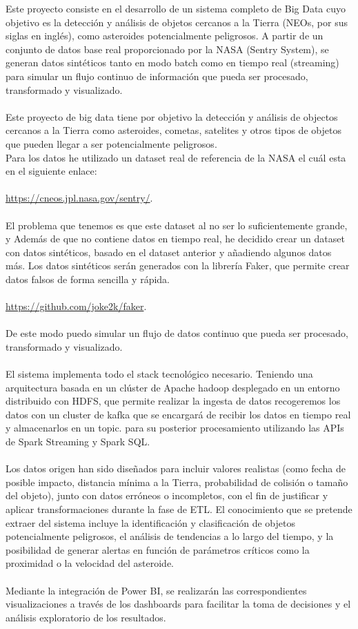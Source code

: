 \documentclass[12pt]{article}
\begin{document}
Este proyecto consiste en el desarrollo de un sistema completo de Big Data cuyo objetivo es la detección 
y análisis de objetos cercanos a la Tierra (NEOs, por sus siglas en inglés), como asteroides 
potencialmente peligrosos. A partir de un conjunto de datos base real proporcionado por la NASA 
(Sentry System), se generan datos sintéticos tanto en modo batch como en tiempo real (streaming) 
para simular un flujo continuo de información que pueda ser procesado, transformado y visualizado.
\\
\\
Este proyecto de big data tiene por objetivo la detección y análisis de objectos cercanos a la Tierra
como asteroides, cometas, satelites y otros tipos de objetos que pueden llegar a ser potencialmente
peligrosos. 
\\
Para los datos he utilizado un dataset real de referencia de la NASA el cuál esta en el siguiente
enlace: 
\\
\\
\url{https://cneos.jpl.nasa.gov/sentry/}.
\\
\\
El problema que tenemos es que este dataset al no ser lo suficientemente grande, y Además
de que no contiene datos en tiempo real, he decidido crear un dataset con datos sintéticos,
basado en el dataset anterior y añadiendo algunos datos más. Los datos sintéticos serán 
generados con la librería Faker, que permite crear datos falsos de forma sencilla y rápida.
\\
\\
\url{https://github.com/joke2k/faker}.
\\
\\
De este modo puedo simular un flujo de datos continuo que pueda ser procesado, transformado 
y visualizado.
\\
\\
El sistema implementa todo el stack tecnológico necesario. Teniendo una arquitectura basada en 
un clúster de Apache hadoop desplegado en un entorno distribuido con HDFS, que permite realizar
la ingesta de datos recogeremos los datos con un cluster de kafka que se encargará de recibir
los datos en tiempo real y almacenarlos en un topic. para su posterior procesamiento utilizando
las APIs de Spark Streaming y Spark SQL.
\\
\\
Los datos origen han sido diseñados para incluir valores realistas (como fecha de posible impacto, 
distancia mínima a la Tierra, probabilidad de colisión o tamaño del objeto), junto con datos 
erróneos o incompletos, con el fin de justificar y aplicar transformaciones durante la fase de ETL. 
El conocimiento que se pretende extraer del sistema incluye la identificación y clasificación de 
objetos potencialmente peligrosos, el análisis de tendencias a lo largo del tiempo, y la 
posibilidad de generar alertas en función de parámetros críticos como la proximidad o la 
velocidad del asteroide.
\\
\\
Mediante la integración de Power BI, se realizarán las correspondientes visualizaciones 
a través de los dashboards para facilitar la toma de decisiones y el análisis exploratorio de 
los resultados.
\end{document}
